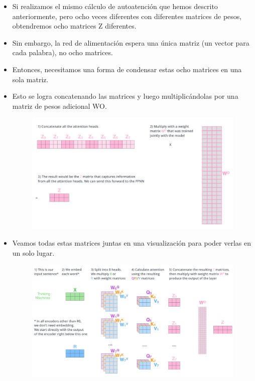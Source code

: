 \begin{itemize}
\item Si realizamos el mismo cálculo de autoatención que hemos descrito anteriormente, pero ocho veces diferentes con diferentes matrices de pesos, obtendremos ocho matrices Z diferentes.

\item Sin embargo, la red de alimentación espera una única matriz (un vector para cada palabra), no ocho matrices.

\item Entonces, necesitamos una forma de condensar estas ocho matrices en una sola matriz.

\item Esto se logra concatenando las matrices y luego multiplicándolas por una matriz de pesos adicional WO.

\begin{figure}[h]
  \centering
  \includegraphics[scale=0.22]{pics/transformer_attention_heads_weight_matrix_o.png}
\end{figure}

\item Veamos todas estas matrices juntas en una visualización para poder verlas en un solo lugar.

\begin{figure}[h]
  \centering
  \includegraphics[scale=0.226]{pics/transformer_multi-headed_self-attention-recap.png}
\end{figure}

\end{itemize}


